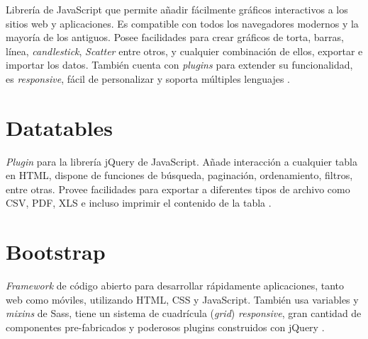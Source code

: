 Librería de JavaScript que permite añadir fácilmente gráficos
interactivos a los sitios web y aplicaciones. Es compatible con todos los
navegadores modernos y la mayoría de los antiguos. Posee facilidades para crear
gráficos de torta, barras, línea, \textit{candlestick}, \textit{Scatter} entre otros, y
cualquier combinación de ellos, exportar e importar los datos. También cuenta
con \textit{plugins} para extender su funcionalidad, es \textit{responsive},
fácil de personalizar y soporta múltiples lenguajes \cite{Amcharts}.

\section{Datatables}

\textit{Plugin} para la librería jQuery de JavaScript. Añade interacción
a cualquier tabla en HTML, dispone de funciones de búsqueda, paginación,
ordenamiento, filtros, entre otras. Provee facilidades para exportar a
diferentes tipos de archivo como CSV, PDF, XLS e incluso imprimir el contenido
de la tabla \cite{Datatables}.

\section{Bootstrap}

\textit{Framework} de código abierto para desarrollar rápidamente
aplicaciones, tanto web como móviles, utilizando HTML, CSS y JavaScript.
También usa variables y \textit{mixins} de Sass, tiene un sistema de cuadrícula
(\textit{grid}) \textit{responsive}, gran cantidad de componentes pre-fabricados y poderosos plugins construidos con jQuery \cite{Bootstrap}.
